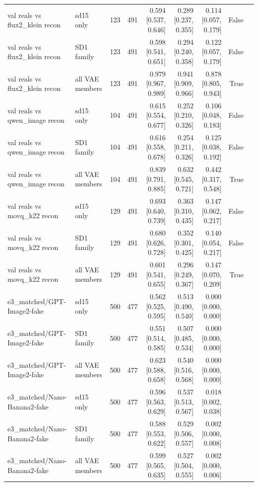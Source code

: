 \begin{table}[htbp]
\begin{tabular}{llrrrrrrr}
val reals vs flux2\_klein recon & sd15 only & 123 & 491 & 0.594 [0.537, 0.646] & 0.289 [0.237, 0.355] & 0.114 [0.057, 0.179] & False &  \\
val reals vs flux2\_klein recon & SD1 family & 123 & 491 & 0.598 [0.541, 0.651] & 0.294 [0.240, 0.358] & 0.122 [0.057, 0.179] & False &  \\
val reals vs flux2\_klein recon & all VAE members & 123 & 491 & 0.979 [0.967, 0.989] & 0.941 [0.909, 0.966] & 0.878 [0.805, 0.943] & True &  \\
val reals vs qwen\_image recon & sd15 only & 104 & 491 & 0.615 [0.554, 0.677] & 0.252 [0.210, 0.326] & 0.106 [0.048, 0.183] & False &  \\
val reals vs qwen\_image recon & SD1 family & 104 & 491 & 0.616 [0.558, 0.678] & 0.254 [0.211, 0.326] & 0.125 [0.038, 0.192] & False &  \\
val reals vs qwen\_image recon & all VAE members & 104 & 491 & 0.839 [0.791, 0.885] & 0.632 [0.545, 0.721] & 0.442 [0.317, 0.548] & True &  \\
val reals vs movq\_k22 recon & sd15 only & 129 & 491 & 0.693 [0.640, 0.739] & 0.363 [0.310, 0.435] & 0.147 [0.062, 0.217] & False &  \\
val reals vs movq\_k22 recon & SD1 family & 129 & 491 & 0.680 [0.626, 0.728] & 0.352 [0.301, 0.425] & 0.140 [0.054, 0.217] & False &  \\
val reals vs movq\_k22 recon & all VAE members & 129 & 491 & 0.601 [0.541, 0.655] & 0.296 [0.249, 0.367] & 0.147 [0.070, 0.209] & True &  \\
e3\_matched/GPT-Image2-fake & sd15 only & 500 & 477 & 0.562 [0.525, 0.595] & 0.513 [0.490, 0.540] & 0.000 [0.000, 0.000] &  &  \\
e3\_matched/GPT-Image2-fake & SD1 family & 500 & 477 & 0.551 [0.514, 0.585] & 0.507 [0.485, 0.534] & 0.000 [0.000, 0.000] &  &  \\
e3\_matched/GPT-Image2-fake & all VAE members & 500 & 477 & 0.623 [0.588, 0.658] & 0.540 [0.516, 0.568] & 0.000 [0.000, 0.000] &  &  \\
e3\_matched/Nano-Banana2-fake & sd15 only & 500 & 477 & 0.596 [0.563, 0.629] & 0.537 [0.513, 0.567] & 0.018 [0.002, 0.038] &  &  \\
e3\_matched/Nano-Banana2-fake & SD1 family & 500 & 477 & 0.588 [0.553, 0.622] & 0.529 [0.506, 0.557] & 0.002 [0.000, 0.008] &  &  \\
e3\_matched/Nano-Banana2-fake & all VAE members & 500 & 477 & 0.599 [0.565, 0.635] & 0.527 [0.504, 0.555] & 0.002 [0.000, 0.006] &  &  \\

\end{tabular}
\end{table}
